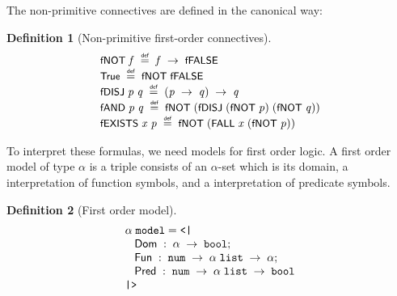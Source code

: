\documentclass[letterpaper]{article}
\newtheorem{defn}{Definition}
\renewcommand{\HOLConst}[1]{{\textsf{\upshape\small #1}}}
\newenvironment{holmath}{\begin{displaymath}\begin{array}{l}}{\end{array}\end{displaymath}\ignorespacesafterend}
\begin{document}
The non-primitive connectives are defined in the canonical way:
\begin{defn}[Non-primitive first-order connectives]
\begin{holmath}
  \HOLConst{fNOT}\;\HOLFreeVar{f}\;\HOLSymConst{\HOLTokenDefEquality{}}\;\HOLFreeVar{f}\;\HOLSymConst{\ensuremath{\rightarrow}}\;\HOLConst{fFALSE}\\
  \HOLConst{True}\;\HOLSymConst{\HOLTokenDefEquality{}}\;\HOLConst{fNOT}\;\HOLConst{fFALSE}\\
  \HOLConst{fDISJ}\;\HOLFreeVar{p}\;\HOLFreeVar{q}\;\HOLSymConst{\HOLTokenDefEquality{}}\;(\HOLFreeVar{p}\;\HOLSymConst{\ensuremath{\rightarrow}}\;\HOLFreeVar{q})\;\HOLSymConst{\ensuremath{\rightarrow}}\;\HOLFreeVar{q}\\
  \HOLConst{fAND}\;\HOLFreeVar{p}\;\HOLFreeVar{q}\;\HOLSymConst{\HOLTokenDefEquality{}}\;\HOLConst{fNOT}\;(\HOLConst{fDISJ}\;(\HOLConst{fNOT}\;\HOLFreeVar{p})\;(\HOLConst{fNOT}\;\HOLFreeVar{q}))\\
  \HOLConst{fEXISTS}\;\HOLFreeVar{x}\;\HOLFreeVar{p}\;\HOLSymConst{\HOLTokenDefEquality{}}\;\HOLConst{fNOT}\;(\HOLConst{FALL}\;\HOLFreeVar{x}\;(\HOLConst{fNOT}\;\HOLFreeVar{p}))
\end{holmath}
\end{defn}
To interpret these formulas, we need models for first order logic. A first order model of type $\alpha$ is a triple consists of an $\alpha$-set which is its domain, a interpretation of function symbols, and a interpretation of predicate symbols.
\begin{defn}[First order model]
\begin{holmath}
  \ensuremath{\alpha}\;\HOLTyOp{model} = \HOLTokenLeftrec{}\\
\;\;\;\HOLFieldName{Dom}\;:\;\ensuremath{\alpha}\;\ensuremath{\rightarrow}\;\HOLTyOp{bool};\\
\;\;\;\HOLFieldName{Fun}\;:\;\HOLTyOp{num}\;\ensuremath{\rightarrow}\;\ensuremath{\alpha}\;\HOLTyOp{list}\;\ensuremath{\rightarrow}\;\ensuremath{\alpha};\\
\;\;\;\HOLFieldName{Pred}\;:\;\HOLTyOp{num}\;\ensuremath{\rightarrow}\;\ensuremath{\alpha}\;\HOLTyOp{list}\;\ensuremath{\rightarrow}\;\HOLTyOp{bool}\\
\HOLTokenRightrec{}
\end{holmath}
\end{defn}
\end{document}
